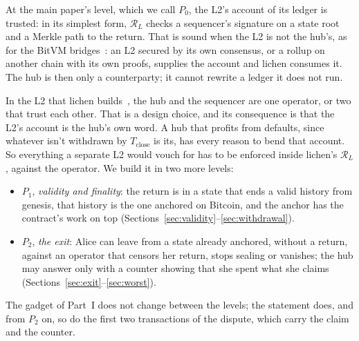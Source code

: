 \documentclass[11pt]{article}
\newcommand{\Tc}{T_{\mathrm{close}}}
\begin{document}
At the main paper's level, which we call $P_0$, the L2's account of its
ledger is trusted: in its simplest form, $\mathcal{R}_L$ checks a
sequencer's signature on a state root and a Merkle path to the return.
That is sound when the L2 is not the hub's, as for the BitVM
bridges~\cite{bitvm2usenix}: an L2 secured by its own consensus, or a
rollup on another chain with its own proofs, supplies the account and
lichen consumes it. The hub is then only a counterparty; it cannot
rewrite a ledger it does not run.

In the L2 that lichen builds~\cite{lichencode}, the hub and the
sequencer are one operator, or two that trust each other. That is a
design choice, and its consequence is that the L2's account is the hub's
own word. A hub that profits from defaults, since whatever isn't
withdrawn by $\Tc$ is its, has every reason to bend that account. So
everything a separate L2 would vouch for has to be enforced inside
lichen's $\mathcal{R}_L$, against the operator. We build it in two more
levels:
\begin{itemize}[leftmargin=1.5em]
\item $P_1$, \emph{validity and finality}: the return is in a state that
  ends a valid history from genesis, that history is the one anchored on
  Bitcoin, and the anchor has the contract's work on top
  (Sections~\ref{sec:validity}--\ref{sec:withdrawal}).
\item $P_2$, \emph{the exit}: Alice can leave from a state already
  anchored, without a return, against an operator that censors her
  return, stops sealing or vanishes; the hub may answer only with a
  counter showing that she spent what she claims
  (Sections~\ref{sec:exit}--\ref{sec:worst}).
\end{itemize}
The gadget of Part~I does not change between the levels; the statement
does, and from $P_2$ on, so do the first two transactions of the
dispute, which carry the claim and the counter.
\end{document}
